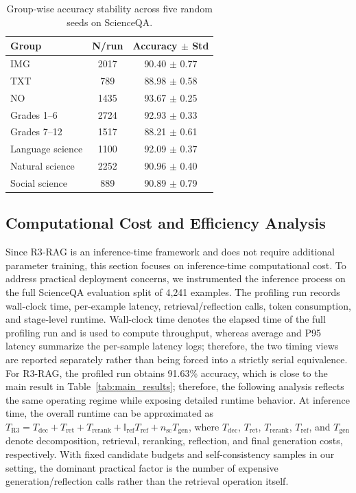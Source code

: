 \documentclass[a4paper, fleqn]{cas-dc}
\begin{document}
\begin{table}[t]
    \centering
    \caption{Group-wise accuracy stability across five random seeds on ScienceQA.}
    \label{tab:group_reliability}
    \vspace{1mm}
        \begin{tabular*}{\linewidth}{@{\extracolsep{\fill}}lcc@{}}
            \toprule
            \textbf{Group} & \textbf{N/run} & \textbf{Accuracy $\pm$ Std} \\
            \midrule
            IMG & 2017 & 90.40 $\pm$ 0.77 \\
            TXT & 789 & 88.98 $\pm$ 0.58 \\
            NO & 1435 & 93.67 $\pm$ 0.25 \\
            Grades 1--6 & 2724 & 92.93 $\pm$ 0.33 \\
            Grades 7--12 & 1517 & 88.21 $\pm$ 0.61 \\
            Language science & 1100 & 92.09 $\pm$ 0.37 \\
            Natural science & 2252 & 90.96 $\pm$ 0.40 \\
            Social science & 889 & 90.89 $\pm$ 0.79 \\
            \bottomrule
        \end{tabular*}
\end{table}

\subsection{Computational Cost and Efficiency Analysis}\label{sec:cost_efficiency_analysis}
Since R3-RAG is an inference-time framework and does not require additional parameter training, this section focuses on inference-time computational cost. To address practical deployment concerns, we instrumented the inference process on the full ScienceQA evaluation split of 4,241 examples.
The profiling run records wall-clock time, per-example latency, retrieval/reflection calls, token consumption, and stage-level runtime. Wall-clock time denotes the elapsed time of the full profiling run and is used to compute throughput, whereas average and P95 latency summarize the per-sample latency logs; therefore, the two timing views are reported separately rather than being forced into a strictly serial equivalence.
For R3-RAG, the profiled run obtains 91.63\% accuracy, which is close to the main result in Table~\ref{tab:main_results}; therefore, the following analysis reflects the same operating regime while exposing detailed runtime behavior.
At inference time, the overall runtime can be approximated as $T_{\mathrm{R3}}=T_{\mathrm{dec}}+T_{\mathrm{ret}}+T_{\mathrm{rerank}}+\mathbb{I}_{\mathrm{ref}}T_{\mathrm{ref}}+n_{\mathrm{sc}}T_{\mathrm{gen}}$, where $T_{\mathrm{dec}}$, $T_{\mathrm{ret}}$, $T_{\mathrm{rerank}}$, $T_{\mathrm{ref}}$, and $T_{\mathrm{gen}}$ denote decomposition, retrieval, reranking, reflection, and final generation costs, respectively.
With fixed candidate budgets and self-consistency samples in our setting, the dominant practical factor is the number of expensive generation/reflection calls rather than the retrieval operation itself.
\end{document}
